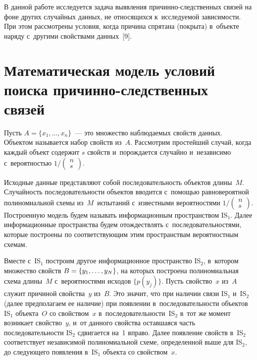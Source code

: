 \begin{multicols}{2}
{}
  
  В данной работе исследуется задача выявления  
при\-чин\-но-след\-ст\-вен\-ных связей на фоне других случайных данных, не 
относящихся к~ис\-сле\-ду\-емой за\-ви\-си\-мости. При этом рассмотрены условия, когда 
причина спрятана (покрыта) в~объекте наряду с~другими свойствами данных~[9].
  
  \section{Математическая модель условий поиска  
причинно-следственных связей}
  
  Пусть $A=\{x_1, \ldots, x_n\}$~---  это множество наблюдаемых свойств данных. 
Объектом называется набор свойств из~$A$. Рассмотрим простейший случай, 
когда каж\-дый объект содержит $s$ свойств и~по\-рож\-да\-ет\-ся случайно и~независимо 
с~вероятностью $1/\begin{pmatrix} n \\ s\end{pmatrix}$. 
  
  Исходные данные представляют собой последовательность объектов 
длины~$M$. Случайность по\-сле\-до\-ва\-тель\-ности объектов вводится с~по\-мощью 
равновероятной полиномиальной схемы из~$M$~испытаний с~известными 
вероятностями $1/\begin{pmatrix} n\\ s\end{pmatrix}$. Построенную модель будем 
называть информационным пространством IS$_1$. Далее информационные 
пространства будем отож\-дест\-влять с~последовательностями, которые построены 
по соответствующим этим пространствам вероятностным схе\-мам.

  
  Вместе с~IS$_1$ построим другое информационное пространство IS$_2$, 
в~котором множество свойств $B\hm= \{y_1, \ldots , y_N\}$, на которых 
построена  полиномиальная схема длины~$M$ с~вероятностями исходов $\{ 
p(y_j)\}$. Пусть свойство~$x$ из~$A$ служит причиной свойства~$y$ из~$B$. 
Это значит, что при наличии связи IS$_1$ и~IS$_2$ (далее предполагаем ее 
наличие) при появлении в~последовательности объектов IS$_1$ объекта~$O$ со 
свойством~$x$ в~последовательности~IS$_2$ в~тот же момент возникает 
свойство~$y$, и~от данного свойства оставшаяся часть последовательности IS$_2$ 
сдвигается на~1 вправо. Далее появление свойств в~IS$_2$ соответствует 
независимой полиномиальной схеме, определенной выше для IS$_2$, до 
следующего появления в~IS$_1$ объекта со свойством~$x$.



\end{multicols}

